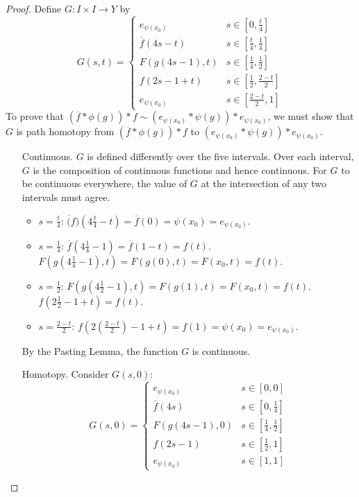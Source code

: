 \begin{proof}
Define $G:I\times I\rightarrow Y$ by 
\[
G(s,t)=
\begin{cases}
e_{\psi(x_0)} & s\in\left[0,\frac{t}{4}\right]\\
\overline{f}(4s-t) & s\in\left[\frac{t}{4},\frac{1}{4}\right]\\
F(g(4s-1),t) & s\in\left[\frac{1}{4},\frac{1}{2}\right]\\
f(2s-1+t) & s\in\left[\frac{1}{2},\frac{2-t}{2}\right]\\
e_{\psi(x_0)} &s\in\left[\frac{2-t}{2},1\right]
\end{cases}
\]
To prove that $\left(\overline{f}*\phi(g)\right)*f\sim \left( e_{\psi(x_0)}*\psi(g)\right)*e_{\psi(x_0)}$, we must show that $G$ is path homotopy from $\left(\overline{f}*\phi(g)\right)*f$ to $\left( e_{\psi(x_0)}*\psi(g)\right)*e_{\psi(x_0)}$.
\begin{itemize}
\item[Continuous.] $G$ is defined differently over the five intervals. Over each interval, $G$ is the composition of continuous functions and hence continuous. For $G$ to be continuous everywhere,  the value of $G$ at the intersection of any two intervals must agree.
\begin{itemize}
\item $s=\frac{t}{4}$: $\overline(f)(4\frac{t}{4}-t)=\overline{f}(0)=\psi(x_0) = e_{\psi(x_0)}$.
\item $s=\frac{1}{4}$: $\overline{f}(4\frac{1}{4}-1)=\overline{f}(1-t)=f(t)$. \\
$F(g(4\frac{1}{4}-1),t)= F(g(0),t)=F(x_0,t)=f(t).$ 
\item  $s=\frac{1}{2}$:  $F(g(4\frac{1}{2}-1),t)= F(g(1),t)=F(x_0,t)=f(t).$\\
$f(2\frac{1}{2}-1+t)=f(t)$. 
\item $s=\frac{2-t}{2}$: $f(2\left(\frac{2-t}{2}\right)-1 +t) = f(1)=\psi(x_0)=e_{\psi(x_0)}$. 
\end{itemize}
By the Pasting Lemma, the function $G$ is continuous.
\item[Homotopy.] Consider $G(s,0)$:
\[
G(s,0)=
\begin{cases}
e_{\psi(x_0)} & s\in\left[0,0\right]\\
\overline{f}(4s) &s\in\left[0,\frac{1}{4}\right]\\
F(g(4s-1),0) &s\in\left[\frac{1}{4},\frac{1}{2}\right]\\
f(2s-1) &s\in\left[\frac{1}{2},1\right]\\
e_{\psi(x_0)} &s\in\left[1,1\right]
\end{cases}
\]
\end{itemize}
\end{proof}
